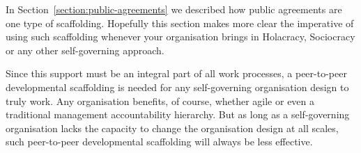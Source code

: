 In Section~\ref{section:public-agreements} we described how public agreements are one type of scaffolding. Hopefully this section makes more clear the imperative of using such scaffolding whenever your organisation brings in Holacracy, Sociocracy or any other self-governing approach.


Since this support must be an integral part of all work processes, a peer-to-peer developmental scaffolding is needed for any self-governing organisation design to truly work. Any organisation benefits, of course, whether agile or even a traditional management accountability hierarchy. But as long as a self-governing organisation lacks the capacity to change the organisation design at all scales, such peer-to-peer developmental scaffolding will always be less effective.
